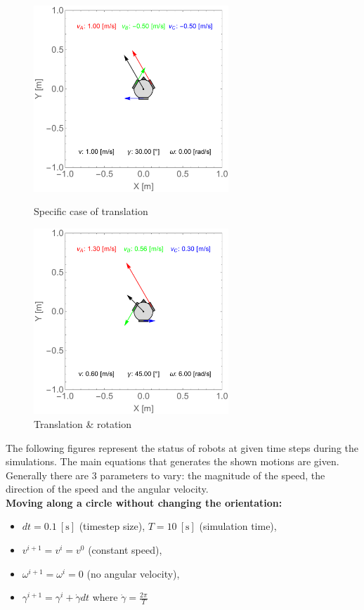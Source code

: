 \documentclass[12pt,english,twoside]{article}
\begin{document}
\begin{figure}[htb!]
	\centering
	\centering
	\includegraphics[height=7cm]{figures/2d_simulation/state_v_1_g_30_w_0}
	\caption{Specific case of translation}
	\label{relation_v_1_g_30_w_0}
	\endminipage\hfill
	\centering
	\includegraphics[height=7cm]{figures/2d_simulation/state_v_06_g_45_w_6}
	\caption{Translation \& rotation}
	\label{relation_v_06_g_45_w_6}
	\endminipage\hfill
\end{figure}
\newpage
The following figures represent the status of robots at given time steps during the simulations. The main equations that generates the shown motions are given. Generally there are 3 parameters to vary: the magnitude of the speed, the direction of the speed and the angular velocity.\\[0.3cm]
\noindent \textbf{Moving along a circle without changing the orientation:}
\begin{itemize}
	\item $dt=0.1~[\text{s}]$ (timestep size), $T=10~[\text{s}]$ (simulation time),
	\item $v^{i+1} = v^{i} = v^{0}$ (constant speed),
	\item $\omega^{i+1} = \omega^{i} = 0$ (no angular velocity),
	\item $\gamma^{i+1} = \gamma^i + \dot \gamma dt$ where $\dot \gamma = \frac{2 \pi}{T}$
\end{itemize}
\end{document}
